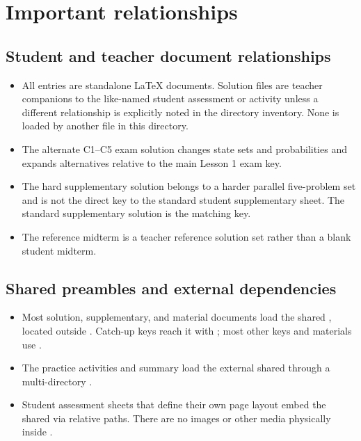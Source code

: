 \section{Important relationships}

\subsection{Student and teacher document relationships}

\begin{itemize}
  \item All entries are standalone LaTeX documents. Solution files are teacher companions to the like-named student assessment or activity unless a different relationship is explicitly noted in the directory inventory. None is loaded by another file in this directory.
  \item The alternate C1–C5 exam solution changes state sets and probabilities and expands alternatives relative to the main Lesson 1 exam key.
  \item The hard supplementary solution belongs to a harder parallel five-problem set and is not the direct key to the standard student supplementary sheet. The standard supplementary solution is the matching key.
  \item The reference midterm is a teacher reference solution set rather than a blank student midterm.
\end{itemize}

\subsection{Shared preambles and external dependencies}

\begin{itemize}
  \item Most solution, supplementary, and material documents load the shared , located outside . Catch-up keys reach it with ; most other keys and materials use .
  \item The practice activities and summary load the external shared  through a multi-directory .
  \item Student assessment sheets that define their own page layout embed the shared  via relative paths. There are no images or other media physically inside .
\end{itemize}


